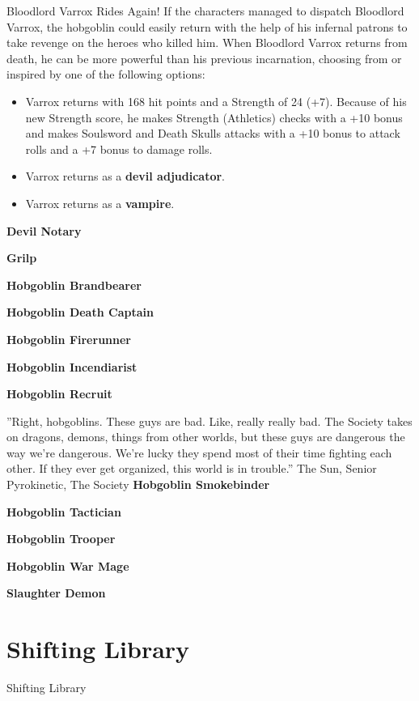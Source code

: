 \documentclass[10pt,a4paper,twoside,bg=print,twocolumn,openany,nodeprecatedcode]{dndbook}
\begin{document}
\begin{DndSidebar}[float=!b]{Bloodlord Varrox Rides Again!}
If the characters managed to dispatch Bloodlord Varrox, the hobgoblin could easily return with the help of his infernal patrons to take revenge on the heroes who killed him. When Bloodlord Varrox returns from death, he can be more powerful than his previous incarnation, choosing from or inspired by one of the following options:




\begin{itemize}
\item Varrox returns with 168 hit points and a Strength of 24 (+7). Because of his new Strength score, he makes Strength (Athletics) checks with a +10 bonus and makes Soulsword and Death Skulls attacks with a +10 bonus to attack rolls and a +7 bonus to damage rolls.
\item Varrox returns as a \textbf{devil adjudicator}.
\item Varrox returns as a \textbf{vampire}.
\end{itemize}



\end{DndSidebar}

\textbf{Devil Notary}

\textbf{Grilp}

\textbf{Hobgoblin Brandbearer}

\textbf{Hobgoblin Death Captain}

\textbf{Hobgoblin Firerunner}

\textbf{Hobgoblin Incendiarist}

\textbf{Hobgoblin Recruit}

\DndQuote%
{}
{''Right, hobgoblins. These guys are bad. Like, really really bad. The Society takes on dragons, demons, things from other worlds, but these guys are dangerous the way we're dangerous. We're lucky they spend most of their time fighting each other. If they ever get organized, this world is in trouble.''}
{The Sun, Senior Pyrokinetic, The Society}
\textbf{Hobgoblin Smokebinder}

\textbf{Hobgoblin Tactician}

\textbf{Hobgoblin Trooper}

\textbf{Hobgoblin War Mage}

\textbf{Slaughter Demon}

\chapter{Shifting Library}
Shifting Library
\end{document}
